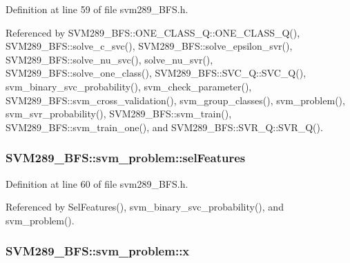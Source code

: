 Definition at line 59 of file svm289\+\_\+\+B\+F\+S.\+h.



Referenced by S\+V\+M289\+\_\+\+B\+F\+S\+::\+O\+N\+E\+\_\+\+C\+L\+A\+S\+S\+\_\+\+Q\+::\+O\+N\+E\+\_\+\+C\+L\+A\+S\+S\+\_\+\+Q(), S\+V\+M289\+\_\+\+B\+F\+S\+::solve\+\_\+c\+\_\+svc(), S\+V\+M289\+\_\+\+B\+F\+S\+::solve\+\_\+epsilon\+\_\+svr(), S\+V\+M289\+\_\+\+B\+F\+S\+::solve\+\_\+nu\+\_\+svc(), solve\+\_\+nu\+\_\+svr(), S\+V\+M289\+\_\+\+B\+F\+S\+::solve\+\_\+one\+\_\+class(), S\+V\+M289\+\_\+\+B\+F\+S\+::\+S\+V\+C\+\_\+\+Q\+::\+S\+V\+C\+\_\+\+Q(), svm\+\_\+binary\+\_\+svc\+\_\+probability(), svm\+\_\+check\+\_\+parameter(), S\+V\+M289\+\_\+\+B\+F\+S\+::svm\+\_\+cross\+\_\+validation(), svm\+\_\+group\+\_\+classes(), svm\+\_\+problem(), svm\+\_\+svr\+\_\+probability(), S\+V\+M289\+\_\+\+B\+F\+S\+::svm\+\_\+train(), S\+V\+M289\+\_\+\+B\+F\+S\+::svm\+\_\+train\+\_\+one(), and S\+V\+M289\+\_\+\+B\+F\+S\+::\+S\+V\+R\+\_\+\+Q\+::\+S\+V\+R\+\_\+\+Q().

\subsubsection[{\texorpdfstring{sel\+Features}{selFeatures}}]{ S\+V\+M289\+\_\+\+B\+F\+S\+::svm\+\_\+problem\+::sel\+Features}\hypertarget{struct_s_v_m289___b_f_s_1_1svm__problem_a3de9b51904777989df0afaed3af9b616}{}\label{struct_s_v_m289___b_f_s_1_1svm__problem_a3de9b51904777989df0afaed3af9b616}


Definition at line 60 of file svm289\+\_\+\+B\+F\+S.\+h.



Referenced by Sel\+Features(), svm\+\_\+binary\+\_\+svc\+\_\+probability(), and svm\+\_\+problem().

\subsubsection[{\texorpdfstring{x}{x}}]{ S\+V\+M289\+\_\+\+B\+F\+S\+::svm\+\_\+problem\+::x}\hypertarget{struct_s_v_m289___b_f_s_1_1svm__problem_a41858dbcf26913311ad17674d9eb42a8}{}\label{struct_s_v_m289___b_f_s_1_1svm__problem_a41858dbcf26913311ad17674d9eb42a8}


